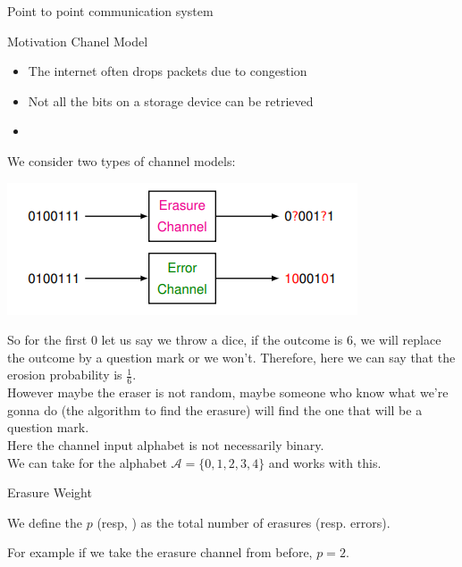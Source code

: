 

\begin{parag}{Point to point communication system}
    
\end{parag}


\begin{parag}{Motivation Chanel Model}
    \begin{itemize}
        \item The internet often drops packets due to congestion
        \item Not all the bits on a storage device can be retrieved
        \item {}
    \end{itemize}
    We consider two types of channel models:
    \begin{center}
        \includegraphics[scale=1]{12025-04-29.png}
    \end{center}
    So for the first $0$ let us say we throw a dice, if the outcome is $6$, we will replace the outcome by a question mark or we won't. Therefore, here we can say that the erosion probability is $\frac{1}{6}$.\\
    However maybe the eraser is not random, maybe someone who know what we're gonna do (the algorithm to find the erasure) will find the one that will be a question mark.
\\
Here the channel input alphabet is not necessarily binary.\\
We can take for the alphabet $\mathcal{A} = \{0, 1, 2, 3, 4\}$ and works with this.
\end{parag}
\begin{parag}{Erasure Weight}
    \begin{definition}
    We define the  $p$ (resp, ) as the total number of erasures (resp. errors).
    \end{definition}
    
    For example if we take the erasure channel from before, $p= 2$.
\end{parag}
